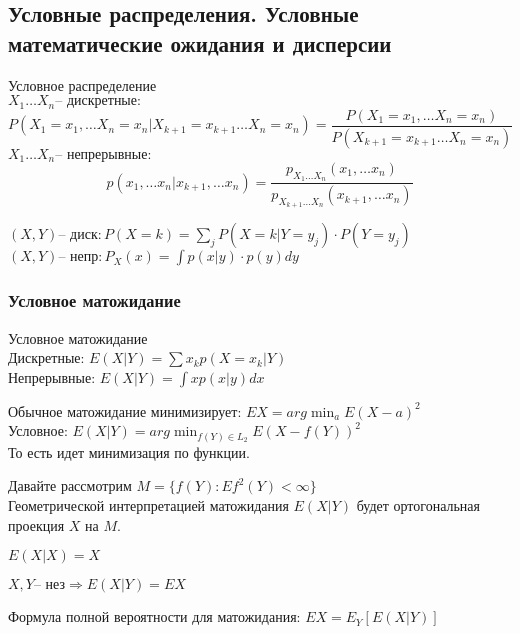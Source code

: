 \documentclass{article}
\begin{document}
    \subsection{Условные распределения. Условные математические ожидания и дисперсии}
    \begin{definition}{Условное распределение}\\
        $X_1 \dots X_n \text{-- дискретные}:$ 
        $$P(X_1=x_1, \dots X_n=x_n | X_{k+1}=x_{k+1} \dots X_n=x_n) = \frac{P(X_1=x_1, \dots X_n=x_n)}{P(X_{k+1}=x_{k+1} \dots X_n=x_n)}$$
        $X_1 \dots X_n \text{-- непрерывные}:$
        $$ p(x_1, \dots x_n | x_{k+1}, \dots x_n) = \frac{p_{X_1\dots X_n}(x_1, \dots x_n)}{p_{X_{k+1}\dots X_n}(x_{k+1}, \dots x_n)}$$
    \end{definition}
    \begin{example}
        $(X, Y) \text{-- диск}: P(X=k) = \sum\limits_j P(X=k| Y=y_j) \cdot P(Y=y_j)$\\
        $(X, Y) \text{-- непр}: P_X(x) = \int p(x|y) \cdot p(y) dy$
    \end{example}
    \subsubsection{Условное матожидание}
    \begin{definition}{Условное матожидание}
        \\
        Дискретные: $E(X|Y) = \sum x_k p(X=x_k| Y)$\\
        Непрерывные: $E(X|Y) = \int x p(x|y) dx$ 
    \end{definition}
    \begin{remark}
        Обычное матожидание минимизирует: $EX = arg\min_a E(X-a)^2$ \\
        Условное: $E(X|Y) = arg\min_{f(Y)\in L_2} E(X-f(Y))^2$\\
        То есть идет минимизация по функции. 
    \end{remark}
    \begin{remark}
        Давайте рассмотрим 
        $ M = \{f(Y): Ef^2(Y) < \infty\}$\\ 
        Геометрической интерпретацией матожидания $E(X|Y)$ будет ортогональная проекция $X$ на $M$.
    \end{remark}
    \begin{property}
        $E(X|X) = X$
    \end{property}
    \begin{property}
        $X, Y \text{-- нез} \Rightarrow E(X|Y) = EX$
    \end{property}
    \begin{property}
        Формула полной вероятности для матожидания: $EX  = E_Y[E(X|Y)]$
    \end{property}
\end{document}
